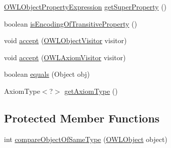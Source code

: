 \begin{DoxyCompactItemize}
\item 
\hyperlink{interfaceorg_1_1semanticweb_1_1owlapi_1_1model_1_1_o_w_l_object_property_expression}{O\-W\-L\-Object\-Property\-Expression} \hyperlink{classuk_1_1ac_1_1manchester_1_1cs_1_1owl_1_1owlapi_1_1_o_w_l_sub_property_chain_axiom_impl_a832c9828f6f81ed31294c4796d2bbb2a}{get\-Super\-Property} ()
\item 
boolean \hyperlink{classuk_1_1ac_1_1manchester_1_1cs_1_1owl_1_1owlapi_1_1_o_w_l_sub_property_chain_axiom_impl_a8193ab16f95dad2fef549c44b644e02f}{is\-Encoding\-Of\-Transitive\-Property} ()
\item 
void \hyperlink{classuk_1_1ac_1_1manchester_1_1cs_1_1owl_1_1owlapi_1_1_o_w_l_sub_property_chain_axiom_impl_af4c7366fea2536e4437c4901ac8b3899}{accept} (\hyperlink{interfaceorg_1_1semanticweb_1_1owlapi_1_1model_1_1_o_w_l_object_visitor}{O\-W\-L\-Object\-Visitor} visitor)
\item 
void \hyperlink{classuk_1_1ac_1_1manchester_1_1cs_1_1owl_1_1owlapi_1_1_o_w_l_sub_property_chain_axiom_impl_ae60d50359e3661a4b473c15ad2220666}{accept} (\hyperlink{interfaceorg_1_1semanticweb_1_1owlapi_1_1model_1_1_o_w_l_axiom_visitor}{O\-W\-L\-Axiom\-Visitor} visitor)
\item 
boolean \hyperlink{classuk_1_1ac_1_1manchester_1_1cs_1_1owl_1_1owlapi_1_1_o_w_l_sub_property_chain_axiom_impl_a36765aa4ff5210ef6d09f11e7a5b231f}{equals} (Object obj)
\item 
Axiom\-Type$<$?$>$ \hyperlink{classuk_1_1ac_1_1manchester_1_1cs_1_1owl_1_1owlapi_1_1_o_w_l_sub_property_chain_axiom_impl_a4116fec758dd2888eefd8bc65cc725d6}{get\-Axiom\-Type} ()
\end{DoxyCompactItemize}
\subsection*{Protected Member Functions}
\begin{DoxyCompactItemize}
\item 
int \hyperlink{classuk_1_1ac_1_1manchester_1_1cs_1_1owl_1_1owlapi_1_1_o_w_l_sub_property_chain_axiom_impl_a168c30c5f06ce56e3235c13fe51b31ee}{compare\-Object\-Of\-Same\-Type} (\hyperlink{interfaceorg_1_1semanticweb_1_1owlapi_1_1model_1_1_o_w_l_object}{O\-W\-L\-Object} object)
\end{DoxyCompactItemize}
